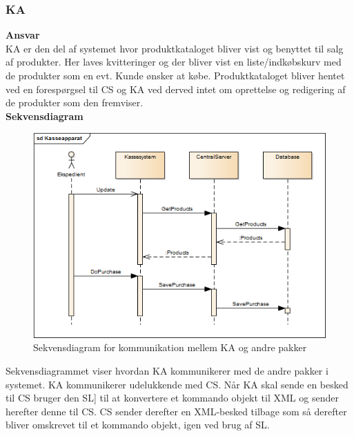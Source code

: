 \subsubsection{\gls{KA}}

\textbf{Ansvar} \\
\gls{KA} er den del af systemet hvor produktkataloget bliver vist og benyttet til salg af produkter. Her laves kvitteringer og der bliver vist en liste/indkøbskurv med de produkter som en evt. \gls{Kunde} ønsker at købe. Produktkataloget bliver hentet ved en forespørgsel til \gls{CS} og \gls{KA} ved derved intet om oprettelse og redigering af de produkter som den fremviser. \\

\textbf{Sekvensdiagram}
\begin{figure}[H]
	\centering
	\includegraphics[width=\textwidth]{Systemarkitektur/LogiskView/Kasseapparat-sekvensdiagram}
	\caption{Sekvensdiagram for kommunikation mellem \gls{KA} og andre pakker}
	\label{fig:logview_kasse_sekvensdiagram}
\end{figure}

Sekvensdiagrammet viser hvordan \gls{KA} kommunikerer med de andre pakker i systemet. \gls{KA} kommunikerer udelukkende med \gls{CS}. Når \gls{KA} skal sende en besked til \gls{CS} bruger den \gls{SL}] til at konvertere et kommando objekt til XML og sender herefter denne til \gls{CS}. \gls{CS} sender derefter en XML-besked tilbage som så derefter bliver omskrevet til et kommando objekt, igen ved brug af \gls{SL}.

\newpage
